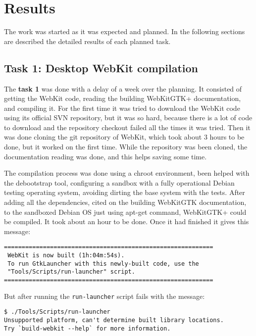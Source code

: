 \documentclass[a4paper,11pt,openany]{report}
\begin{document}
\chapter{Results}
The work was started as it was expected and planned. In the following sections are described the detailed results of each planned task.

\section{Task 1: Desktop WebKit compilation}
The \textbf{task 1} was done with a delay of a week over the planning. It consisted of getting the WebKit code, reading the building WebKitGTK+\cite{build webkitgtk+} documentation, and compiling it.
For the first time it was tried to download the WebKit code using its official SVN repository, but it was so hard, because there is a lot of code to download and the repository checkout failed all the times it was tried. Then it was done cloning the git repository of WebKit\cite{git webkit}, which took about 3 hours to be done, but it worked on the first time.
While the repository was been cloned, the documentation reading was done, and this helps saving some time.

The compilation process was done using a chroot\cite{chroot} environment, been helped with the debootstrap\cite{debootstrap} tool, configuring a sandbox with a fully operational Debian testing operating system, avoiding dirting the base system with the tests.
After adding all the dependencies, cited on the building WebKitGTK documentation, to the sandboxed Debian OS just using apt-get command, WebKitGTK+ could be compiled. It took about an hour to be done. Once it had finished it gives this message:

{
\footnotesize
\begin{lstlisting}
===========================================================
 WebKit is now built (1h:04m:54s).
 To run GtkLauncher with this newly-built code, use the
 "Tools/Scripts/run-launcher" script.
===========================================================
\end{lstlisting}
}

But after running the \verb#run-launcher# script fails with the message:

{
\footnotesize
\begin{lstlisting}
$ ./Tools/Scripts/run-launcher
Unsupported platform, can't determine built library locations.
Try `build-webkit --help` for more information.
\end{lstlisting}
}
\end{document}

